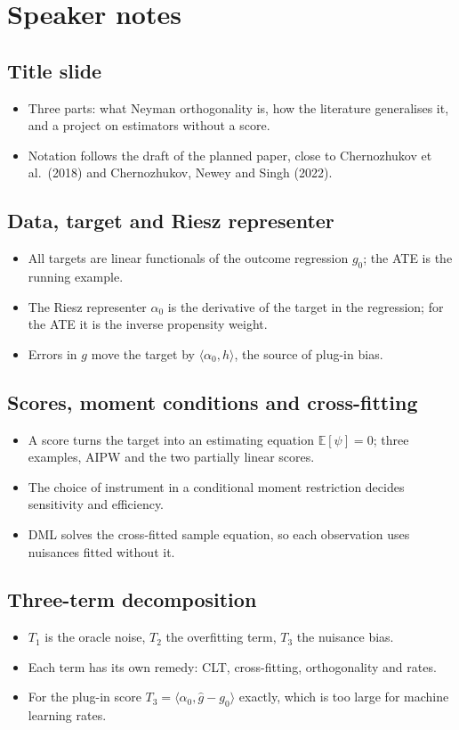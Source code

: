 \documentclass[11pt]{article}
\newcommand{\E}{\mathbb{E}}
\begin{document}
\section{Speaker notes}

\subsection*{Title slide}
\begin{itemize}
\item Three parts: what Neyman orthogonality is, how the literature generalises it, and a project on estimators without a score.
\item Notation follows the draft of the planned paper, close to Chernozhukov et al.\ (2018) and Chernozhukov, Newey and Singh (2022).
\end{itemize}

\subsection*{Data, target and Riesz representer}
\begin{itemize}
\item All targets are linear functionals of the outcome regression $g_0$; the ATE is the running example.
\item The Riesz representer $\alpha_0$ is the derivative of the target in the regression; for the ATE it is the inverse propensity weight.
\item Errors in $g$ move the target by $\langle\alpha_0,h\rangle$, the source of plug-in bias.
\end{itemize}

\subsection*{Scores, moment conditions and cross-fitting}
\begin{itemize}
\item A score turns the target into an estimating equation $\E[\psi]=0$; three examples, AIPW and the two partially linear scores.
\item The choice of instrument in a conditional moment restriction decides sensitivity and efficiency.
\item DML solves the cross-fitted sample equation, so each observation uses nuisances fitted without it.
\end{itemize}

\subsection*{Three-term decomposition}
\begin{itemize}
\item $T_1$ is the oracle noise, $T_2$ the overfitting term, $T_3$ the nuisance bias.
\item Each term has its own remedy: CLT, cross-fitting, orthogonality and rates.
\item For the plug-in score $T_3=\langle\alpha_0,\hat g-g_0\rangle$ exactly, which is too large for machine learning rates.
\end{itemize}
\end{document}
